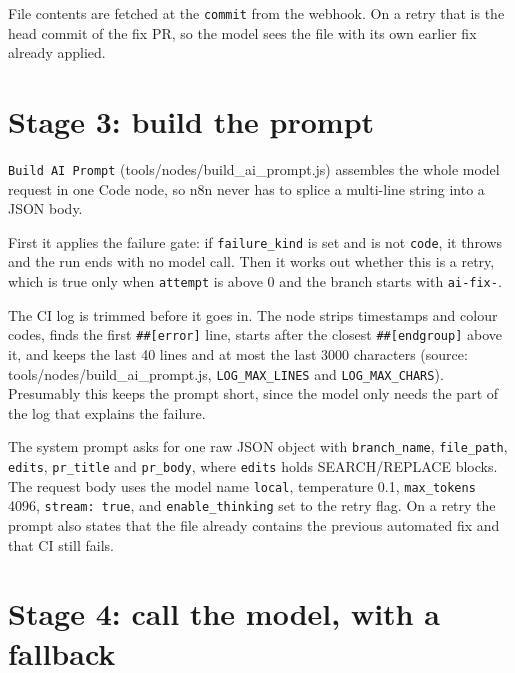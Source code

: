 File contents are fetched at the \texttt{commit} from the webhook. On a retry that is the head commit of the fix PR, so the model sees the file with its own earlier fix already applied.

\section{Stage 3: build the prompt}

\texttt{Build AI Prompt} (tools/\allowbreak{}nodes/\allowbreak{}build\_\allowbreak{}ai\_\allowbreak{}prompt.js) assembles the whole model request in one Code node, so n8n never has to splice a multi-line string into a JSON body.

First it applies the failure gate: if \texttt{failure\_\allowbreak{}kind} is set and is not \texttt{code}, it throws and the run ends with no model call. Then it works out whether this is a retry, which is true only when \texttt{attempt} is above 0 and the branch starts with \texttt{ai-\allowbreak{}fix-\allowbreak{}}.

The CI log is trimmed before it goes in. The node strips timestamps and colour codes, finds the first \texttt{\#\#[error]} line, starts after the closest \texttt{\#\#[endgroup]} above it, and keeps the last 40 lines and at most the last 3000 characters (source: tools/\allowbreak{}nodes/\allowbreak{}build\_\allowbreak{}ai\_\allowbreak{}prompt.js, \texttt{LOG\_\allowbreak{}MAX\_\allowbreak{}LINES} and \texttt{LOG\_\allowbreak{}MAX\_\allowbreak{}CHARS}). Presumably this keeps the prompt short, since the model only needs the part of the log that explains the failure.

The system prompt asks for one raw JSON object with \texttt{branch\_\allowbreak{}name}, \texttt{file\_\allowbreak{}path}, \texttt{edits}, \texttt{pr\_\allowbreak{}title} and \texttt{pr\_\allowbreak{}body}, where \texttt{edits} holds SEARCH/\allowbreak{}REPLACE blocks. The request body uses the model name \texttt{local}, temperature 0.1, \texttt{max\_\allowbreak{}tokens} 4096, \texttt{stream:\allowbreak{} true}, and \texttt{enable\_\allowbreak{}thinking} set to the retry flag. On a retry the prompt also states that the file already contains the previous automated fix and that CI still fails.

\section{Stage 4: call the model, with a fallback}



